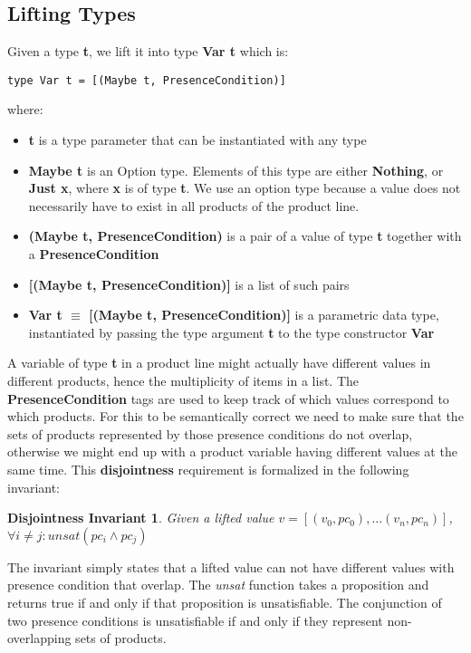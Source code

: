 \documentclass[10pt,conference]{IEEEtran}
\begin{document}
\subsection{Lifting Types}
Given a type \textbf{t}, we lift it into type \textbf{Var t} which is:

\begin{verbatim}
type Var t = [(Maybe t, PresenceCondition)]
\end{verbatim}

where:
\begin{itemize}
\item \textbf{t} is a type parameter that can be instantiated with any type
\item \textbf{Maybe t} is  an Option type. Elements of this type are either \textbf{Nothing}, or \textbf{Just x}, where \textbf{x} is of type \textbf{t}. We use an option type because a value does not necessarily have to exist in all products of the product line.
\item \textbf{(Maybe t, PresenceCondition)} is a pair of a value of type \textbf{t} together with a \textbf{PresenceCondition}
\item \textbf{[(Maybe t, PresenceCondition)]} is a list of such pairs
\item \textbf{Var t $\equiv$ [(Maybe t, PresenceCondition)]} is a parametric data type, instantiated by passing the type argument \textbf{t} to the type constructor \textbf{Var}
\end{itemize}

A variable of type \textbf{t} in a product line might actually have different values in different products, hence the multiplicity of items in a list. The \textbf{PresenceCondition} tags are used to keep track of which values correspond to which products. For this to be semantically correct we need to make sure that the sets of products represented by those presence conditions do not overlap, otherwise we might end up with a product variable having different values at the same time. This \textbf{disjointness} requirement is formalized in the following invariant:

\newtheorem*{disjInv*}{Disjointness Invariant}
\begin{disjInv*}
Given a lifted value $v = [(v_0, pc_0), ... (v_n, pc_n)]$, $\forall i \neq j: {unsat (pc_i \wedge pc_j)}$
\end{disjInv*}

The invariant simply states that a lifted value can not have different values with presence condition that overlap. The \emph{unsat} function takes a proposition and returns true if and only if that proposition is unsatisfiable. The conjunction of two presence conditions is unsatisfiable if and only if they represent non-overlapping sets of products.
\end{document}
